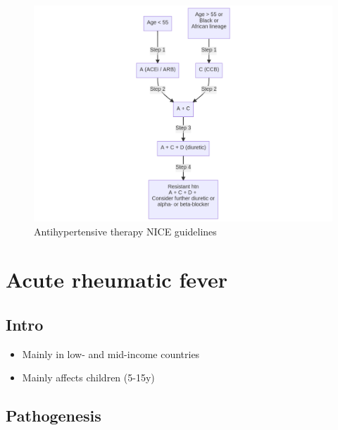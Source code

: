 \documentclass[
  12pt,
]{memoir}
\providecommand{\tightlist}{%
  \setlength{\itemsep}{0pt}\setlength{\parskip}{0pt}}
\begin{document}
\begin{figure}[!h]
    \centering
    \includegraphics[width=\textwidth]{../assets/med/antihtn.png}
    \vspace{5mm}
    \caption{Antihypertensive therapy NICE guidelines}
    \label{fig:antihtn}
\end{figure}

\hypertarget{acute-rheumatic-fever}{%
\section{Acute rheumatic fever}\label{acute-rheumatic-fever}}

\hypertarget{intro-8}{%
\subsection{Intro}\label{intro-8}}

\begin{itemize}
\tightlist
\item
  Mainly in low- and mid-income countries
\item
  Mainly affects children (5-15y)
\end{itemize}

\hypertarget{pathogenesis-5}{%
\subsection{Pathogenesis}\label{pathogenesis-5}}
\end{document}
